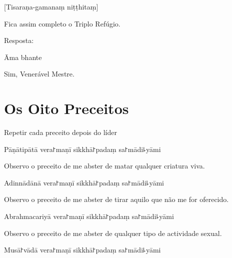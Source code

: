 [Tisaraṇa-gamanaṃ niṭṭhitaṃ]

\begin{english}
  Fica assim completo o Triplo Refúgio.
\end{english}

\begin{instruction}
  Resposta:
\end{instruction}

Āma bhante

\begin{english}
  Sim, Venerável Mestre.
\end{english}

\chapter{Os Oito Preceitos}

\begin{instruction}
  Repetir cada preceito depois do líder
\end{instruction}

\begin{precept}
  \setcounter{enumi}{0}
  \item Pāṇātipātā vera꜓maṇī sikkhā꜓padaṃ sa꜓mādi꜕yāmi
\end{precept}

\begin{english}
  Observo o preceito de me abster de matar qualquer criatura viva.
\end{english}

\begin{precept}
  \setcounter{enumi}{1}
  \item Adinnādānā vera꜓maṇī sikkhā꜓padaṃ sa꜓mādi꜕yāmi
\end{precept}

\begin{english}
  Observo o preceito de me abster de tirar aquilo que não me for oferecido.
\end{english}

\begin{precept}
  \setcounter{enumi}{2}
  \item Abrahmacariyā vera꜓maṇī sikkhā꜓padaṃ sa꜓mādi꜕yāmi
\end{precept}

\begin{english}
  Observo o preceito de me abster de qualquer tipo de actividade sexual.
\end{english}

\begin{precept}
  \setcounter{enumi}{3}
  \item Musā꜓vādā vera꜓maṇī sikkhā꜓padaṃ sa꜓mādi꜕yāmi
\end{precept}

